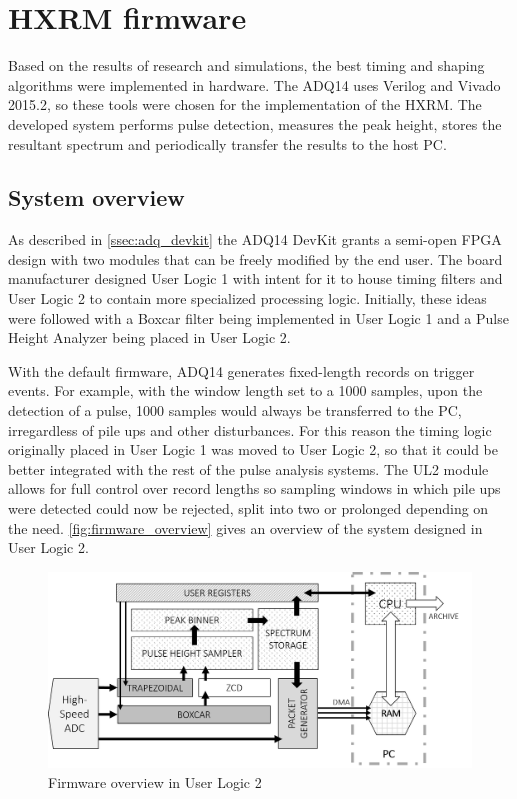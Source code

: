 \section{HXRM firmware}

Based on the results of research and simulations, the best timing
and shaping algorithms were implemented in hardware.
The ADQ14 uses Verilog and Vivado 2015.2, so these tools
were chosen for the implementation of the HXRM.
The developed system performs pulse detection,
measures the peak height, stores the resultant spectrum
and periodically transfer the results to the host PC.

\subsection{System overview}

As described in \autoref{ssec:adq_devkit} the ADQ14 DevKit
grants a semi-open FPGA design with two modules that can be
freely modified by the end user. The board manufacturer
designed User Logic 1 with intent for it to house timing filters
and User Logic 2 to contain more specialized processing logic.
Initially, these ideas were followed with a Boxcar filter being
implemented in User Logic 1 and a Pulse Height Analyzer being placed 
in User Logic 2.


With the default firmware, ADQ14 generates fixed-length records
on trigger events. For example, with the window length set to a 1000
samples, upon the detection of a pulse, 1000 samples would always be
transferred to the PC, irregardless of pile ups and other disturbances.
For this reason the timing logic originally placed in User Logic 1 was moved
to User Logic 2, so that it could be better integrated with the rest 
of the pulse analysis systems. The UL2 module allows for full control 
over record lengths so sampling windows in which pile ups were detected
could now be rejected, split into two or prolonged depending on the need.
\autoref{fig:firmware_overview} gives an overview of the system designed
in User Logic 2.

\begin{figure}[H]
  \centering
  \includegraphics[width=\linewidth]{media/fpga_system_trap.png}
  \caption{Firmware overview in User Logic 2}
  \label{fig:firmware_overview} 
\end{figure}
